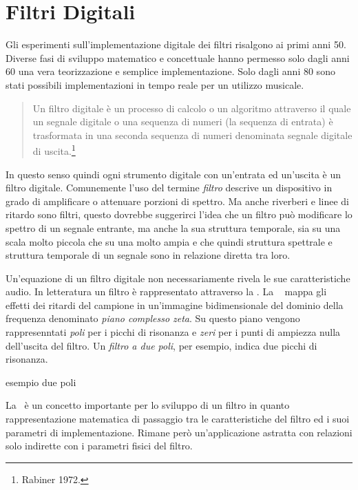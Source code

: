 
\section{Filtri Digitali}

Gli esperimenti sull'implementazione digitale dei filtri risalgono ai primi anni 50.
Diverse fasi di sviluppo matematico e concettuale hanno permesso solo dagli anni 60
una vera teorizzazione e semplice implementazione. Solo dagli anni 80 sono stati
possibili implementazioni in tempo reale per un utilizzo musicale.

\begin{quote}
  Un filtro digitale è un processo di calcolo o un algoritmo attraverso il quale
  un segnale digitale o una sequenza di numeri (la sequenza di entrata) è
  trasformata in una seconda sequenza di numeri denominata segnale digitale di
  uscita.\footnote{Rabiner 1972.}
\end{quote}

In questo senso quindi ogni strumento digitale con un'entrata ed un'uscita è un
filtro digitale. Comunemente l'uso del termine \emph{filtro} descrive un dispositivo
in grado di amplificare o attenuare porzioni di spettro. Ma anche riverberi e linee
di ritardo sono filtri, questo dovrebbe suggerirci l'idea che un filtro può
modificare lo spettro di un segnale entrante, ma anche la sua struttura temporale,
sia su una scala molto piccola che su una molto ampia e che quindi struttura
spettrale e struttura temporale di un segnale sono in relazione diretta tra loro.

Un'equazione di un filtro digitale non necessariamente rivela le sue caratteristiche
audio. In letteratura un filtro è rappresentato attraverso la \tz.
La \tz~ mappa gli effetti dei ritardi del campione in un'immagine
bidimensionale del dominio della frequenza denominato \emph{piano complesso zeta}.
Su questo piano vengono rappresenntati \emph{poli} per i picchi di risonanza e
\emph{zeri} per i punti di ampiezza nulla dell'uscita del filtro. Un \emph{filtro
a due poli}, per esempio, indica due picchi di risonanza.

esempio due poli

La \tz~è un concetto importante per lo sviluppo di un filtro in quanto rappresentazione
matematica di passaggio tra le caratteristiche del filtro ed i suoi parametri di
implementazione. Rimane però un'applicazione astratta con relazioni solo indirette
con i parametri fisici del filtro.

